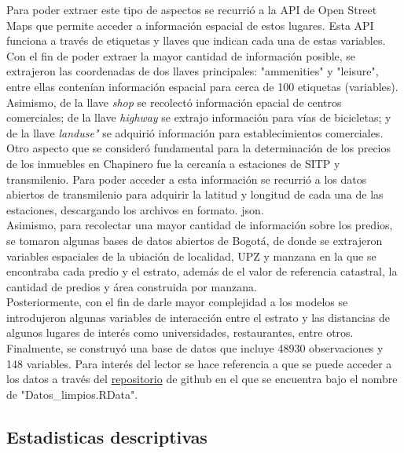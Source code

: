 \documentclass[12pt]{article}
\begin{document}
Para poder extraer este tipo de aspectos se recurrió a la API de Open Street Maps que permite acceder a información espacial de estos lugares. Esta API funciona a través de etiquetas y llaves que indican cada una de estas variables. \\

Con el fin de poder extraer la mayor cantidad de información posible, se extrajeron las coordenadas de dos llaves principales: "ammenities" y "leisure", entre ellas contenían información espacial para cerca de 100 etiquetas (variables). Asimismo, de la llave \textit{shop} se recolectó información epacial de centros comerciales; de la llave \textit{highway} se extrajo información para vías de bicicletas; y de la llave \textit{landuse"} se adquirió información para establecimientos comerciales.\\

Otro aspecto que se consideró fundamental para la determinación de los precios de los inmuebles en Chapinero fue la cercanía a estaciones de SITP y transmilenio. Para poder acceder a esta información se recurrió a los datos abiertos de transmilenio para adquirir la latitud y longitud de cada una de las estaciones, descargando los archivos en formato. json.\\

Asimismo, para recolectar una mayor cantidad de información sobre los predios, se tomaron algunas bases de datos abiertos de Bogotá, de donde se extrajeron variables  espaciales de la ubiación de localidad, UPZ y manzana en la que se encontraba cada predio y el estrato, además de el valor de referencia catastral, la cantidad de predios y área construida por manzana.\\

Posteriormente, con el fin de darle mayor complejidad a los modelos se introdujeron algunas variables de interacción entre el estrato y las distancias de algunos lugares de interés como universidades, restaurantes, entre otros.\\

Finalmente, se construyó una base de datos que incluye 48930 observaciones y 148 variables. Para interés del lector se hace referencia a que se puede acceder a los datos a través del \href{https://github.com/jbermudezc01/Problem_set2_BDML}{repositorio} de github en el que se encuentra bajo el nombre de "Datos\_limpios.RData".\\


\subsection{ Estadisticas descriptivas }
\end{document}
